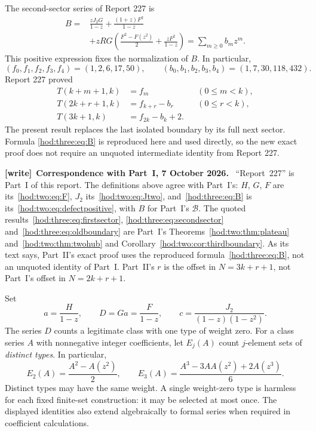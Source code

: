 \documentclass[11pt,letterpaper]{article}
\theoremstyle{definition}\newtheorem{definition}[theorem]{Definition}
\theoremstyle{remark}\newtheorem{remark}[theorem]{Remark}
\newcommand{\Bcal}{\mathcal B}
\newenvironment{writenote}[1][]{\par\smallskip\begingroup\small
 \noindent\textbf{[write]}\if\relax\detokenize{#1}\relax\else~\textbf{#1.}\fi\ }%
 {\par\endgroup\smallskip}
\begin{document}
The second-sector series of Report 227 \cite{report227} is
\begin{equation}\label{hod:three:eq:B}
\begin{split}
B={}&\frac{zJ_2G}{1-z}+\frac{(1+z)F^2}{1-z}\\
&+zRG\left(\frac{F^2-F(z^2)}2+\frac{zF^2}{1-z}\right)
=\sum_{m\ge0}b_mz^m.
\end{split}
\end{equation}
This positive expression fixes the normalization of $B$. In particular,
\[
(f_0,f_1,f_2,f_3,f_4)=(1,2,6,17,50),\qquad
(b_0,b_1,b_2,b_3,b_4)=(1,7,30,118,432).
\]
Report 227 proved
\begin{align}
T(k+m+1,k)&=f_m &&(0\le m<k),\label{hod:three:eq:firstsector}\\
T(2k+r+1,k)&=f_{k+r}-b_r &&(0\le r<k),\label{hod:three:eq:secondsector}\\
T(3k+1,k)&=f_{2k}-b_k+2.\label{hod:three:eq:oldboundary}
\end{align}
The present result replaces the last isolated boundary by its full next sector. Formula \eqref{hod:three:eq:B} is reproduced here and used directly, so the new exact proof does not require an unquoted intermediate identity from Report 227.
\begin{writenote}[Correspondence with Part~I, 7 October 2026]
``Report~227'' is Part~I of this report. The definitions above agree with
Part~I's: $H$, $G$, $F$ are its~\eqref{hod:two:eq:F}, $J_2$ its~\eqref{hod:two:eq:Jtwo},
and~\eqref{hod:three:eq:B} is its~\eqref{hod:two:eq:defectpositive}, with $B$
for Part~I's $\Bcal$. The quoted results~\eqref{hod:three:eq:firstsector},
\eqref{hod:three:eq:secondsector} and~\eqref{hod:three:eq:oldboundary} are
Part~I's Theorems~\ref{hod:two:thm:plateau} and~\ref{hod:two:thm:twohub} and
Corollary~\ref{hod:two:cor:thirdboundary}. As its text says, Part~II's exact proof uses the reproduced
formula~\eqref{hod:three:eq:B}, not an unquoted identity of Part~I. Part~II's $r$ is the offset
in $N=3k+r+1$, not Part~I's offset in $N=2k+r+1$.
\end{writenote}

Set
\begin{equation}\label{hod:three:eq:aux}
a=\frac H{1-z},\qquad D=Ga=\frac F{1-z},\qquad
c=\frac{J_2}{(1-z)(1-z^2)}.
\end{equation}
The series $D$ counts a legitimate class with one type of weight zero. For a class series $A$ with nonnegative integer coefficients, let $E_j(A)$ count $j$-element sets of \emph{distinct types}. In particular,
\begin{equation}\label{hod:three:eq:E23}
E_2(A)=\frac{A^2-A(z^2)}2,\qquad
E_3(A)=\frac{A^3-3A A(z^2)+2A(z^3)}6.
\end{equation}
Distinct types may have the same weight. A single weight-zero type is harmless for each fixed finite-set construction: it may be selected at most once. The displayed identities also extend algebraically to formal series when required in coefficient calculations.
\end{document}
